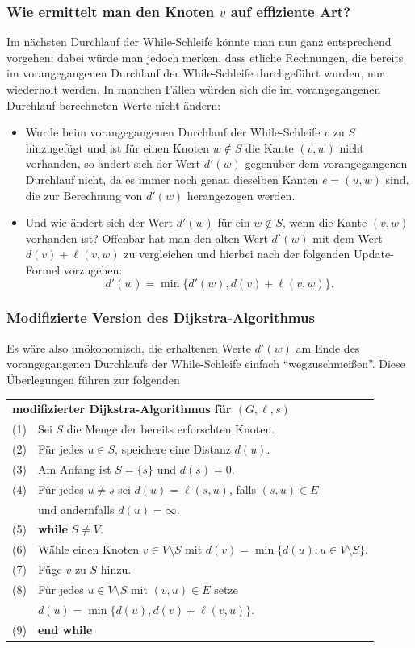 \documentclass[smaller]{beamer}
\begin{document}
\begin{frame}
\frametitle{Wie ermittelt man den Knoten $v$ auf effiziente Art?}
Im nächsten Durchlauf der While-Schleife könnte man nun ganz entsprechend vorgehen; dabei würde man jedoch merken, dass etliche Rechnungen, die bereits im vorangegangenen Durchlauf der While-Schleife durchgeführt wurden, nur wiederholt werden. In manchen Fällen würden sich die im vorangegangenen Durchlauf berechneten Werte \alert{nicht ändern:}
\begin{itemize}
\item Wurde beim vorangegangenen Durchlauf der While-Schleife $v$ zu $S$ hinzugefügt und ist für einen Knoten $w \notin S$ die Kante $(v,w)$ nicht vorhanden, so ändert sich der Wert $d'(w)$ gegenüber dem vorangegangenen Durchlauf nicht, da es immer noch genau dieselben Kanten $e=(u,w)$ sind, die zur Berechnung von $d'(w)$ herangezogen werden.

\item \alert{Und wie ändert sich der Wert $d'(w)$ für ein $w \notin S$, wenn die Kante $(v,w)$ vorhanden ist?} Offenbar hat man den alten Wert $d'(w)$ mit dem Wert $d(v) + \ell(v,w)$ zu vergleichen und hierbei nach der folgenden Update-Formel vorzugehen:
\[
d'(w) = \min{\big\{ d'(w), d(v)+\ell(v,w) \big\}}.
\]
\end{itemize}
\end{frame}

\begin{frame}
\frametitle{Modifizierte Version des Dijkstra-Algorithmus}
Es wäre also unökonomisch, die erhaltenen Werte $d'(w)$ am Ende des vorangegangenen Durchlaufs der While-Schleife einfach \enquote{wegzuschmeißen}. Diese Überlegungen führen zur folgenden 

\begin{center}
\label{page:12:2}
\begin{tabular}{rl}
\multicolumn{2}{l}{\textbf{modifizierter Dijkstra-Algorithmus für $(G, \ell, s)$}} \\
 (1)& Sei $S$ die Menge der bereits erforschten Knoten. \\
 (2)& Für jedes $u \in S$, speichere eine Distanz $d(u)$. \\
 (3)& Am Anfang ist $S = \{ s \}$ und $d(s)=0$. \\
 (4)& Für jedes $u \neq s$ sei $d(u) = \ell(s,u)$, falls $(s,u)\in E$ \\
    & und andernfalls $d(u)=\infty$. \\
 (5)& \textbf{while} $S \neq V$. \\
 (6)& \qquad Wähle einen Knoten $v \in V \setminus S$ mit $d(v) = \min{\big\{ d(u) : u \in V \setminus S \big\}}$. \\
 (7)& \qquad Füge $v$ zu $S$ hinzu. \\
 (8)& \qquad Für jedes $u \in V \setminus S$ mit $(v,u) \in E$ setze \\
    & \qquad $d(u) = \min{\bigl\{ d(u), d(v) + \ell(v,u) \bigr\}}$. \\
 (9)& \textbf{end while}
\end{tabular}
\end{center}
\end{frame}
\end{document}
